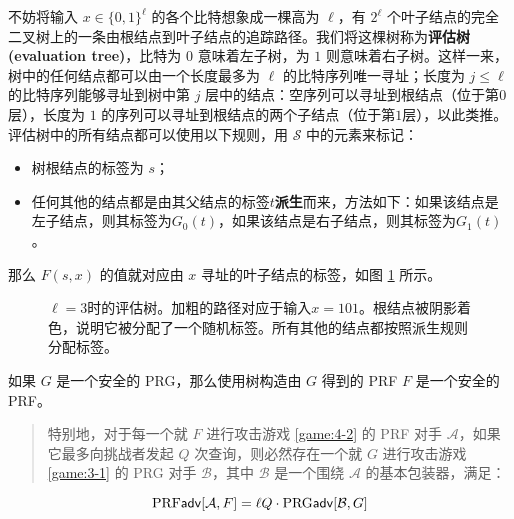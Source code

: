 不妨将输入 $x\in\{0,1\}^\ell$ 的各个比特想象成一棵高为 $\ell$，有 $2^\ell$ 个叶子结点的完全二叉树上的一条由根结点到叶子结点的追踪路径。我们将这棵树称为\textbf{评估树 (evaluation tree)}，比特为 $0$ 意味着左子树，为 $1$ 则意味着右子树。这样一来，树中的任何结点都可以由一个长度最多为 $\ell$ 的比特序列唯一寻址；长度为 $j\leq\ell$ 的比特序列能够寻址到树中第 $j$ 层中的结点：空序列可以寻址到根结点（位于第$0$层），长度为 $1$ 的序列可以寻址到根结点的两个子结点（位于第$1$层），以此类推。评估树中的所有结点都可以使用以下规则，用 $\mathcal{S}$ 中的元素来标记：
\begin{itemize}
	\item 树根结点的标签为 $s$；
	\item 任何其他的结点都是由其父结点的标签$t$\textbf{派生}而来，方法如下：如果该结点是左子结点，则其标签为$G_0(t)$，如果该结点是右子结点，则其标签为$G_1(t)$。
\end{itemize}
那么 $F(s,x)$ 的值就对应由 $x$ 寻址的叶子结点的标签，如图 \ref{fig:4-15} 所示。

\begin{figure}
  \centering
  
  \caption{$\ell=3$时的评估树。加粗的路径对应于输入$x=101$。根结点被阴影着色，说明它被分配了一个随机标签。所有其他的结点都按照派生规则分配标签。}
  \label{fig:4-15}
\end{figure}

\begin{theorem}\label{theo:4-10}
如果 $G$ 是一个安全的 PRG，那么使用树构造由 $G$ 得到的 PRF $F$ 是一个安全的 PRF。
\begin{quote}
特别地，对于每一个就 $F$ 进行攻击游戏 \ref{game:4-2} 的 PRF 对手 $\mathcal{A}$，如果它最多向挑战者发起 $Q$ 次查询，则必然存在一个就 $G$ 进行攻击游戏 \ref{game:3-1} 的 PRG 对手 $\mathcal{B}$，其中 $\mathcal{B}$ 是一个围绕 $\mathcal{A}$ 的基本包装器，满足：
\end{quote}
\[
{\rm PRF\mathsf{adv}}[\mathcal{A},F]=\ell Q\cdot{\rm PRG\mathsf{adv}}[\mathcal{B},G]
\]
\end{theorem}

